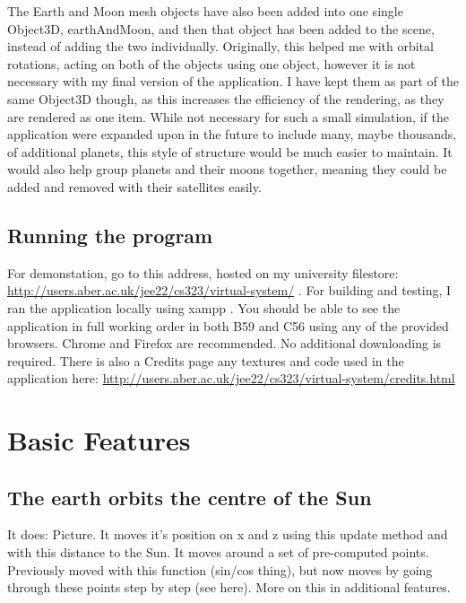 \documentclass[12pt]{article}
\begin{document}
The Earth and Moon mesh objects have also been added into one single Object3D, earthAndMoon, and then that object has been added to the scene, instead of adding the two individually. Originally, this helped me with orbital rotations, acting on both of the objects using one object, however it is not necessary with my final version of the application. I have kept them as part of the same Object3D though, as this increases the efficiency of the rendering, as they are rendered as one item. While not necessary for such a small simulation, if the application were expanded upon in the future to include many, maybe thousands, of additional planets, this style of structure would be much easier to maintain. It would also help group planets and their moons together, meaning they could be added and removed with their satellites easily.

\subsection{Running the program}
For demonstation, go to this address, hosted on my university filestore: \url{http://users.aber.ac.uk/jee22/cs323/virtual-system/} . For building and testing, I ran the application locally using xampp\cite{xampp} . You should be able to see the application in full working order in both B59 and C56 using any of the provided browsers. Chrome and Firefox are recommended. No additional downloading is required. There is also a Credits page any textures and code used in the application here: \url{http://users.aber.ac.uk/jee22/cs323/virtual-system/credits.html}



\section{Basic Features}
\subsection{The earth orbits the centre of the Sun}
It does: Picture. It moves it's position on x and z using this update method and with this distance to the Sun. It moves around a set of pre-computed points. Previously moved with this function (sin/cos thing), but now moves by going through these points step by step (see here). More on this in additional features.
\end{document}
